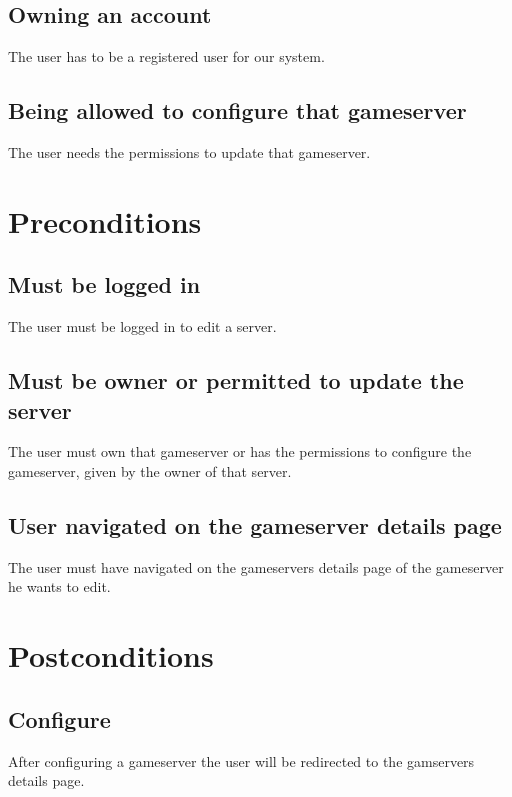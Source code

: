 \documentclass[a4paper,12pt,chapterprefix=false,bibliography=totoc,listof=totoc,]{scrreprt}
\begin{document}
\section{Owning an account}
The user has to be a registered user for our system.

\section{Being allowed to configure that gameserver}
The user needs the permissions to update that gameserver.

\chapter{Preconditions}
\section{Must be logged in}
The user must be logged in to edit a server.

\section{Must be owner or permitted to update the server}
The user must own that gameserver or has the permissions to configure the gameserver, given by the owner of that server.

\section{User navigated on the gameserver details page}
The user must have navigated on the gameservers details page of the gameserver he wants to edit.

\chapter{Postconditions}

\section{Configure}
After configuring a gameserver the user will be redirected to the gamservers details page.
\end{document}
